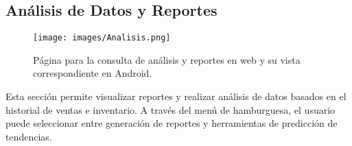 \subsection{Análisis de Datos y Reportes}

\begin{figure}[H]
    \texttt{[image: images/Analisis.png]}
    \centering
    \caption{Página para la consulta de análisis y reportes en web y su vista correspondiente en Android.}
\end{figure}

Esta sección permite visualizar reportes y realizar análisis de datos basados en el historial de ventas e inventario.
A través del menú de hamburguesa, el usuario puede seleccionar entre generación de reportes y herramientas de predicción
de tendencias.
